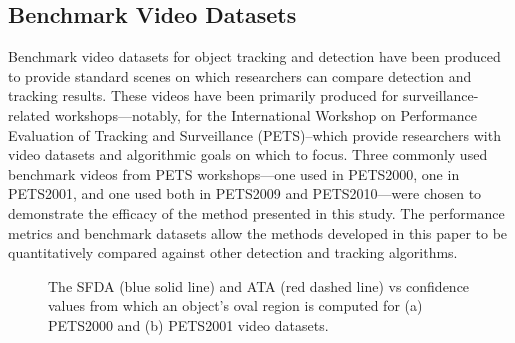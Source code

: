 \documentclass[twocolumn, final]{svjour3}
\begin{document}
\subsection{Benchmark Video Datasets}
\label{sec:benchmarkvideodatasets}

Benchmark video datasets for object tracking and detection have been produced to provide standard scenes on which researchers can compare detection and tracking results. These videos have been primarily produced for surveillance-related workshops---notably, for the International Workshop on Performance Evaluation of Tracking and Surveillance (PETS)--which provide researchers with video datasets and algorithmic goals on which to focus. Three commonly used benchmark videos from PETS workshops---one used in PETS2000, one in PETS2001, and one used both in PETS2009 and PETS2010---were chosen to demonstrate the efficacy of the method presented in this study. The performance metrics and benchmark datasets allow the methods developed in this paper to be quantitatively compared against other detection and tracking algorithms.

\begin{figure}[!]
  \centering             
   \hspace{1mm}
  \caption{The SFDA (blue solid line) and ATA (red dashed line) vs  confidence values from which an object's oval region is computed for (a) PETS2000 and (b) PETS2001 video datasets.}
  \label{fig:pm_conf}
\end{figure}
\end{document}
